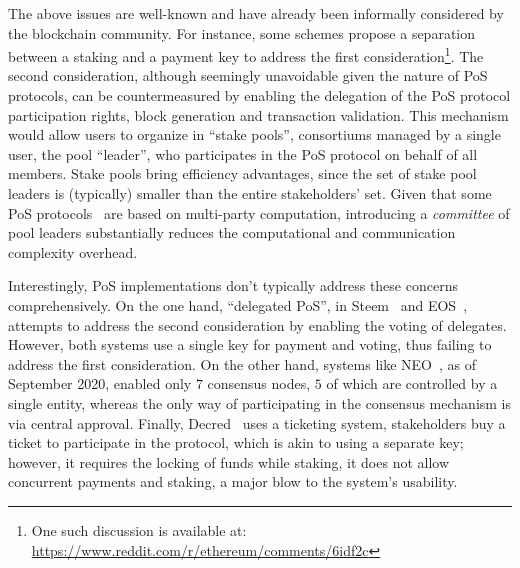 The above issues are well-known and have already been informally considered by
the blockchain community. For instance, some schemes propose a separation
between a staking and a payment key to address the first
consideration\footnote{One such discussion is available at:
\url{https://www.reddit.com/r/ethereum/comments/6idf2c}}.  The second
consideration, although seemingly unavoidable given the nature of PoS
protocols, can be countermeasured by enabling the delegation of the PoS
protocol participation rights, \ie block generation and transaction validation.
This mechanism would allow users to organize in ``stake pools'', \ie
consortiums managed by a single user, the pool ``leader'', who participates in
the PoS protocol on behalf of all members. Stake pools bring efficiency
advantages, since the set of stake pool leaders is (typically) smaller than the
entire stakeholders' set. Given that some PoS protocols~\cite{C:KRDO17} are
based on multi-party computation, introducing a \emph{committee} of pool
leaders substantially reduces the computational and communication complexity
overhead.

Interestingly, PoS implementations don't typically address these concerns
comprehensively. On the one hand, ``delegated PoS'', \eg in Steem~\cite{steem}
and EOS~\cite{eosWhitepaper}, attempts to address the second consideration by
enabling the voting of delegates. However, both systems use a single key for
payment and voting, thus failing to address the first consideration.  On the
other hand, systems like NEO~\cite{neo-consensus}, as of September 2020, enabled
only $7$ consensus nodes, $5$ of which are controlled by a single entity,
whereas the only way of participating in the consensus mechanism is via central
approval. Finally, Decred~\cite{decred} uses a ticketing system, \ie
stakeholders buy a ticket to participate in the protocol, which is akin to
using a separate key; however, it requires the locking of funds while staking,
\ie it does not allow concurrent payments and staking, a major blow to the
system's usability.

